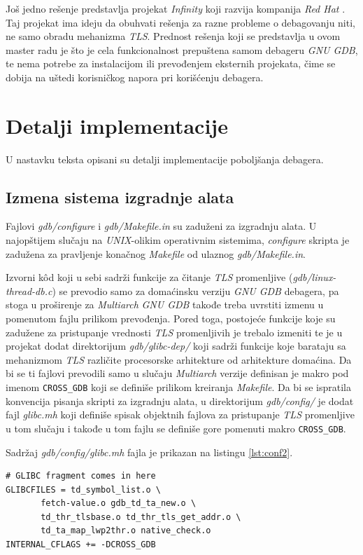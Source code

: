 \documentclass[12pt,oneside]{memoir}
\begin{document}
Još jedno rešenje predstavlja projekat \emph{Infinity} \cite{Infinity} koji razvija kompanija \emph{Red Hat} \cite{REDHAT}. Taj projekat ima ideju da obuhvati rešenja za razne probleme o debagovanju niti, ne samo obradu mehanizma \emph{TLS}. Prednost rešenja koji se predstavlja u ovom master radu je što je cela funkcionalnost prepuštena samom debageru \emph{GNU GDB}, te nema potrebe za instalacijom ili prevođenjem eksternih projekata, čime se dobija na uštedi korisničkog napora pri korišćenju debagera.

\section{Detalji implementacije}

U nastavku teksta opisani su detalji implementacije poboljšanja debagera.

\subsection{Izmena sistema izgradnje alata}

Fajlovi \emph{gdb/configure} i \emph{gdb/Makefile.in} su zaduženi za izgradnju alata. U najopštijem slučaju na \emph{UNIX}-olikim operativnim sistemima, \emph{configure} skripta je zadužena za pravljenje konačnog \emph{Makefile} od ulaznog \emph{gdb/Makefile.in}.

Izvorni k\^{o}d koji u sebi sadrži funkcije za čitanje \emph{TLS} promenljive (\emph{gdb/linux-thread-db.c}) se prevodio samo za domaćinsku verziju \emph{GNU GDB} debagera, pa stoga u proširenje za \emph{Multiarch} \emph{GNU GDB} takođe treba uvrstiti izmenu u pomenutom fajlu prilikom prevođenja. Pored toga, postojeće funkcije koje su zadužene za pristupanje vrednosti \emph{TLS} promenljivih je trebalo izmeniti te je u projekat dodat direktorijum \emph{gdb/glibc-dep/} koji sadrži funkcije koje barataju sa mehanizmom \emph{TLS} različite procesorske arhitekture od arhitekture domaćina. Da bi se ti fajlovi prevodili samo u slučaju \emph{Multiarch} verzije definisan je makro pod imenom \texttt{CROSS\_GDB} koji se definiše prilikom kreiranja \emph{Makefile}. Da bi se ispratila konvencija pisanja skripti za izgradnju alata, u direktorijum \emph{gdb/config/} je dodat fajl \emph{glibc.mh} koji definiše spisak objektnih fajlova za pristupanje \emph{TLS} promenljive u tom slučaju i takođe u tom fajlu se definiše gore pomenuti makro \texttt{CROSS\_GDB}.

Sadržaj \emph{gdb/config/glibc.mh} fajla je prikazan na listingu \ref{lst:conf2}.
\begin{lstlisting}[label={lst:conf2}, caption={Sadržaj \emph{gdb/config/glibc.mh} fajla}]
# GLIBC fragment comes in here
GLIBCFILES = td_symbol_list.o \
       fetch-value.o gdb_td_ta_new.o \
       td_thr_tlsbase.o td_thr_tls_get_addr.o \
       td_ta_map_lwp2thr.o native_check.o
INTERNAL_CFLAGS += -DCROSS_GDB
\end{lstlisting}
\end{document}
